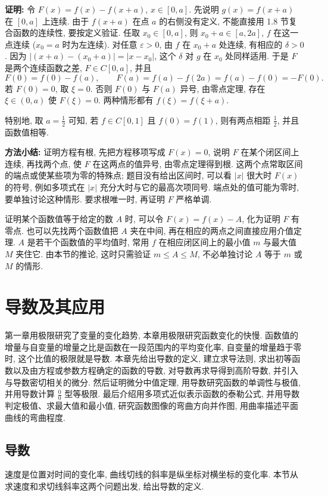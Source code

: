 \documentclass[UTF8,openany]{ctexbook}
\theoremstyle{chinesetextbook}
\newenvironment{cnproof}{\par\indent\textbf{证明:} \ignorespaces}{\par}
\begin{document}
\begin{cnproof}
令 $F(x)=f(x)-f(x+a)$, $x\in[0,a]$. 先说明 $g(x)=f(x+a)$ 在 $[0,a]$ 上连续. 由于 $f(x+a)$ 在点 $a$ 的右侧没有定义, 不能直接用 1.8 节复合函数的连续性, 要按定义验证. 任取 $x_0\in[0,a]$, 则 $x_0+a\in[a,2a]$, $f$ 在这一点连续 ($x_0=a$ 时为左连续). 对任意 $\varepsilon>0$, 由 $f$ 在 $x_0+a$ 处连续, 有相应的 $\delta>0$. 因为 $|(x+a)-(x_0+a)|=|x-x_0|$, 这个 $\delta$ 对 $g$ 在 $x_0$ 处同样适用. 于是 $F$ 是两个连续函数之差, $F\in C[0,a]$, 并且
\[
F(0)=f(0)-f(a),\qquad F(a)=f(a)-f(2a)=f(a)-f(0)=-F(0).
\]
若 $F(0)=0$, 取 $\xi=0$. 否则 $F(0)$ 与 $F(a)$ 异号, 由零点定理, 存在 $\xi\in(0,a)$ 使 $F(\xi)=0$. 两种情形都有 $f(\xi)=f(\xi+a)$.
\end{cnproof}
特别地, 取 $\displaystyle a=\frac12$ 可知, 若 $f\in C[0,1]$ 且 $f(0)=f(1)$, 则有两点相距 $\displaystyle\frac12$, 并且函数值相等.

\par\indent\textbf{方法小结:} 证明方程有根, 先把方程移项写成 $F(x)=0$, 说明 $F$ 在某个闭区间上连续, 再找两个点, 使 $F$ 在这两点的值异号, 由零点定理得到根. 这两个点常取区间的端点或使某些项为零的特殊点; 题目没有给出区间时, 可以看 $|x|$ 很大时 $F(x)$ 的符号, 例如多项式在 $|x|$ 充分大时与它的最高次项同号. 端点处的值可能为零时, 要单独讨论这种情形. 要求根唯一时, 再证明 $F$ 严格单调.

证明某个函数值等于给定的数 $A$ 时, 可以令 $F(x)=f(x)-A$, 化为证明 $F$ 有零点. 也可以先找两个函数值把 $A$ 夹在中间, 再在相应的两点之间直接应用介值定理. $A$ 是若干个函数值的平均值时, 常用 $f$ 在相应闭区间上的最小值 $m$ 与最大值 $M$ 夹住它. 由本节的推论, 这时只需验证 $m\le A\le M$, 不必单独讨论 $A$ 等于 $m$ 或 $M$ 的情形.
\chapter{导数及其应用}
第一章用极限研究了变量的变化趋势, 本章用极限研究函数变化的快慢. 函数值的增量与自变量的增量之比是函数在一段范围内的平均变化率, 自变量的增量趋于零时, 这个比值的极限就是导数. 本章先给出导数的定义, 建立求导法则, 求出初等函数以及由方程或参数方程确定的函数的导数, 对导数再求导得到高阶导数, 并引入与导数密切相关的微分. 然后证明微分中值定理, 用导数研究函数的单调性与极值, 并用导数计算 $\displaystyle\frac00$ 型等极限. 最后介绍用多项式近似表示函数的泰勒公式, 并用导数判定极值、求最大值和最小值, 研究函数图像的弯曲方向并作图, 用曲率描述平面曲线的弯曲程度.
\section{导数}
速度是位置对时间的变化率, 曲线切线的斜率是纵坐标对横坐标的变化率. 本节从求速度和求切线斜率这两个问题出发, 给出导数的定义.
\end{document}
